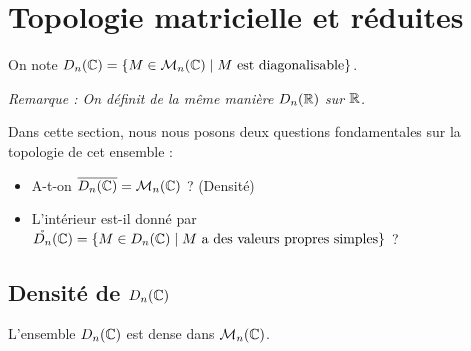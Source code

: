 \section{Topologie matricielle et réduites}

\begin{definitionnt}{}
    On note $D_n(\mathbb{C}) = \left\{ M \in \mathcal{M}_n(\mathbb{C}) \mid M \text{ est diagonalisable} \right\}$.
    
    \svspace
    \textit{Remarque : On définit de la même manière $D_n(\mathbb{R})$ sur $\mathbb{R}$.}
\end{definitionnt}

\avspace
Dans cette section, nous nous posons deux questions fondamentales sur la topologie de cet ensemble :
\begin{itemize}
    \item A-t-on $\overline{D_n(\mathbb{C})} = \mathcal{M}_n(\mathbb{C})$ ? (Densité)
    \item L'intérieur est-il donné par $\mathring{D_n}(\mathbb{C}) = \left\{ M \in D_n(\mathbb{C}) \mid M \text{ a des valeurs propres simples} \right\}$ ?
\end{itemize}


\subsection{Densité de \texorpdfstring{$D_n(\mathbb{C})$}{Dn(C)}}

\begin{propositionnt}{}
    L'ensemble $D_n(\mathbb{C})$ est dense dans $\mathcal{M}_n(\mathbb{C})$.
\end{propositionnt}

